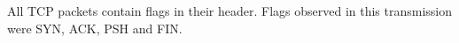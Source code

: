All TCP packets contain flags in their header. Flags observed in this transmission were SYN, ACK, PSH and FIN. 